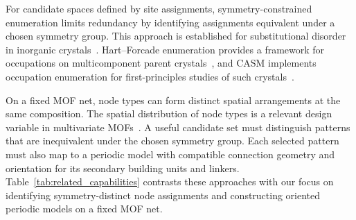 \documentclass[a5paper, 10pt]{article}
\begin{document}
For candidate spaces defined by site assignments, symmetry-constrained enumeration limits redundancy by identifying assignments equivalent under a chosen symmetry group.
This approach is established for substitutional disorder in inorganic crystals~\cite{hart2012generating}. Hart--Forcade enumeration provides a framework for occupations on multicomponent parent crystals~\cite{hart2008algorithm}, and CASM implements occupation enumeration for first-principles studies of such crystals~\cite{PUCHALA2023111897}.%

On a fixed MOF net, node types can form distinct spatial arrangements at the same composition. The spatial distribution of node types is a relevant design variable in multivariate MOFs~\cite{ji2020sequencing}. A useful candidate set must distinguish patterns that are inequivalent under the chosen symmetry group. Each selected pattern must also map to a periodic model with compatible connection geometry and orientation for its secondary building units and linkers. Table~\ref{tab:related_capabilities} contrasts these approaches with our focus on identifying symmetry-distinct node assignments and constructing oriented periodic models on a fixed MOF net. %
\end{document}
